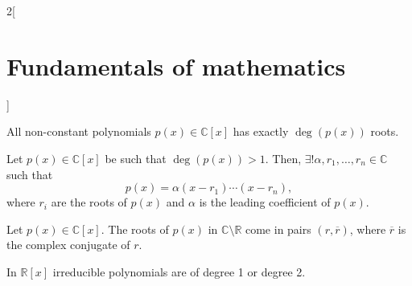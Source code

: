 \documentclass[../../../main.tex]{subfiles}
\begin{document}
\begin{multicols}{2}[\section{Fundamentals of mathematics}]
\begin{theorem}
    All non-constant polynomials $p(x)\in\mathbb{C}[x]$ has exactly $\deg(p(x))$ roots.
\end{theorem}
\begin{corollary}
    Let $p(x)\in\mathbb{C}[x]$ be such that $\deg(p(x))>1$. Then, $\exists!\alpha,r_1,\ldots,r_n\in\mathbb{C}$ such that $$p(x)=\alpha(x-r_1)\cdots(x-r_n),$$ where $r_i$ are the roots of $p(x)$ and $\alpha$ is the leading coefficient of $p(x)$.
\end{corollary}
\begin{corollary}
    Let $p(x)\in\mathbb{C}[x]$. The roots of $p(x)$ in $\mathbb{C}\setminus\mathbb{R}$ come in pairs $(r,\overline{r})$, where $\overline{r}$ is the complex conjugate of $r$.
\end{corollary}
\begin{theorem}
    In $\mathbb{R}[x]$ irreducible polynomials are of degree 1 or degree 2.
\end{theorem}
\end{multicols}
\end{document}
